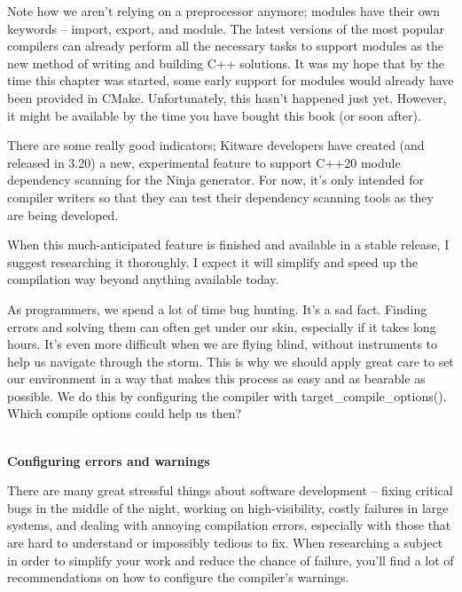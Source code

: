 Note how we aren't relying on a preprocessor anymore; modules have their own keywords – import, export, and module. The latest versions of the most popular compilers can already perform all the necessary tasks to support modules as the new method of writing and building C++ solutions. It was my hope that by the time this chapter was started, some early support for modules would already have been provided in CMake.
Unfortunately, this hasn't happened just yet.
However, it might be available by the time you have bought this book (or soon after).

There are some really good indicators; Kitware developers have created (and released in 3.20) a new, experimental feature to support C++20 module dependency scanning for the Ninja generator. For now, it's only intended for compiler writers so that they can test their dependency scanning tools as they are being developed.

When this much-anticipated feature is finished and available in a stable release, I suggest researching it thoroughly. I expect it will simplify and speed up the compilation way beyond anything available today.


As programmers, we spend a lot of time bug hunting. It's a sad fact. Finding errors and solving them can often get under our skin, especially if it takes long hours. It's even more difficult when we are flying blind, without instruments to help us navigate through the storm. This is why we should apply great care to set our environment in a way that makes this process as easy and as bearable as possible. We do this by configuring the compiler with target\_compile\_options(). Which compile options could help us then?

\hspace*{\fill} \\ %
\noindent
\textbf{Configuring errors and warnings}

There are many great stressful things about software development – fixing critical bugs in the middle of the night, working on high-visibility, costly failures in large systems, and dealing with annoying compilation errors, especially with those that are hard to understand or impossibly tedious to fix. When researching a subject in order to simplify your work and reduce the chance of failure, you'll find a lot of recommendations on how to configure the compiler's warnings.

